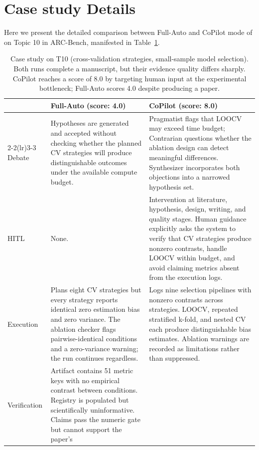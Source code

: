 \section{Case study Details}
\label{app:casestudy}
Here we present the detailed comparison between Full-Auto and CoPilot mode of \system{} on Topic 10 in ARC-Bench, manifested in Table~\ref{tab:case_study}.

\begin{table}[t]
\centering
\caption{Case study on T10 (cross-validation strategies, small-sample model selection). Both runs complete a manuscript, but their evidence quality
differs sharply. CoPilot reaches a score of 8.0 by targeting human input
at the experimental bottleneck; Full-Auto scores 4.0 despite producing a
paper.}
\label{tab:case_study}
\small
\renewcommand{\arraystretch}{1.3}
\setlength{\tabcolsep}{5pt}
\begin{tabular}{@{} l p{5.2cm} p{5.2cm} @{}}
\toprule
& \textbf{Full-Auto (score: 4.0)} & \textbf{CoPilot (score: 8.0)} \\
\cmidrule(lr){2-2}\cmidrule(lr){3-3}
Debate
& Hypotheses are generated and accepted without checking whether the
  planned CV strategies will produce distinguishable outcomes under the
  available compute budget.
& Pragmatist flags that LOOCV may exceed time budget; Contrarian questions
  whether the ablation design can detect meaningful differences.
  Synthesizer incorporates both objections into a narrowed hypothesis set. \\[3pt]
HITL
& None.
& Intervention at literature, hypothesis, design, writing, and quality
  stages. Human guidance explicitly asks the system to verify that CV
  strategies produce nonzero contrasts, handle LOOCV within budget, and
  avoid claiming metrics absent from the execution logs. \\[3pt]
Execution
& Plans eight CV strategies but every strategy reports identical zero
  estimation bias and zero variance. The ablation checker flags
  pairwise-identical conditions and a zero-variance warning; the run
  continues regardless.
& Logs nine selection pipelines with nonzero contrasts across strategies.
  LOOCV, repeated stratified k-fold, and nested CV each produce
  distinguishable bias estimates. Ablation warnings are recorded as
  limitations rather than suppressed. \\[3pt]
Verification
& Artifact contains 51 metric keys with no empirical contrast between
  conditions. Registry is populated but scientifically uninformative.
  Claims pass the numeric gate but cannot support the paper's

\end{tabular}
\end{table}

